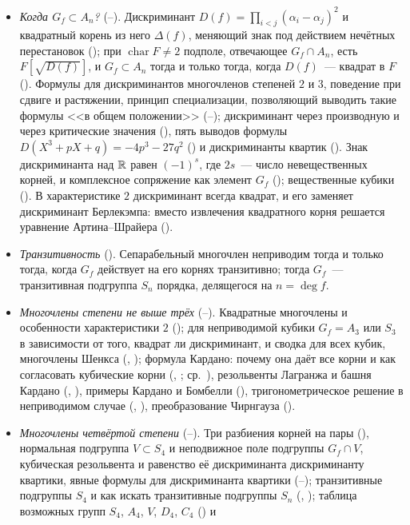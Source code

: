 \begin{itemize}[leftmargin=*]
\item \emph{Когда $G_f\subset A_n$?} (--). Дискриминант $D(f)=\prod_{i<j}(\alpha_i-\alpha_j)^2$ и квадратный
корень из него $\Delta(f)$, меняющий знак под действием нечётных перестановок (); при $\operatorname{char}F\ne2$
подполе, отвечающее $G_f\cap A_n$, есть $F[\sqrt{D(f)}]$, и $G_f\subset A_n$ тогда и только тогда, когда $D(f)$~--- квадрат
в $F$ (). Формулы для дискриминантов многочленов степеней $2$ и $3$, поведение при сдвиге и растяжении, принцип
специализации, позволяющий выводить такие формулы <<в общем положении>> (--); дискриминант через
производную и через критические значения (), пять выводов формулы $D(X^3+pX+q)=-4p^3-27q^2$ () и
дискриминанты квартик (). Знак дискриминанта над $\mathbb R$ равен $(-1)^s$, где $2s$~--- число невещественных корней, и
комплексное сопряжение как элемент $G_f$ (); вещественные кубики (). В характеристике $2$ дискриминант
всегда квадрат, и его заменяет дискриминант Берлекэмпа: вместо извлечения квадратного корня решается уравнение
Артина--Шрайера ().
\item \emph{Транзитивность} (). Сепарабельный многочлен неприводим тогда и только тогда, когда $G_f$ действует на
его корнях транзитивно; тогда $G_f$~--- транзитивная подгруппа $S_n$ порядка, делящегося на $n=\deg f$.
\item \emph{Многочлены степени не выше трёх} (--). Квадратные многочлены и особенности характеристики $2$
(); для неприводимой кубики $G_f=A_3$ или $S_3$ в зависимости от того, квадрат ли дискриминант, и сводка для всех
кубик, многочлены Шенкса (, ); формула Кардано: почему она даёт все корни и как согласовать
кубические корни (, ; ср.\ ), резольвенты Лагранжа и башня Кардано (, ),
примеры Кардано и Бомбелли (), тригонометрическое решение в неприводимом случае (, ),
преобразование Чирнгауза ().
\item \emph{Многочлены четвёртой степени} (--). Три разбиения корней на пары (), нормальная
подгруппа $V\subset S_4$ и неподвижное поле подгруппы $G_f\cap V$, кубическая резольвента и равенство её дискриминанта дискриминанту
квартики, явные формулы для дискриминанта квартики (--); транзитивные подгруппы $S_4$ и как искать
транзитивные подгруппы $S_n$ (, ); таблица возможных групп $S_4$, $A_4$, $V$, $D_4$, $C_4$ () и

\end{itemize}
